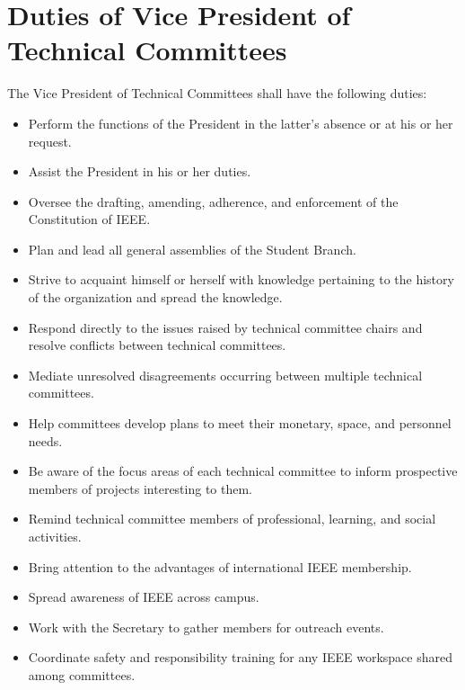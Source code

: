 \documentclass[12pt]{constitution}
\begin{document}
\section{Duties of Vice President of Technical Committees}
\label{sec:officer_vp_Tech}
The Vice President of Technical Committees shall have the following duties:
\begin{itemize}
    \item Perform the functions of the President in the latter's absence or at his or her request.
    \item Assist the President in his or her duties.
    \item Oversee the drafting, amending, adherence, and enforcement of the Constitution of IEEE.
    \item Plan and lead all general assemblies of the Student Branch.
    \item Strive to acquaint himself or herself with knowledge pertaining to the history of the organization and spread the knowledge.
    \item Respond directly to the issues raised by technical committee chairs and resolve conflicts between technical committees.
    \item Mediate unresolved disagreements occurring between multiple technical committees.
    \item Help committees develop plans to meet their monetary, space, and personnel needs.
    \item Be aware of the focus areas of each technical committee to inform prospective members of projects interesting to them.
    \item Remind technical committee members of professional, learning, and social activities.
    \item Bring attention to the advantages of international IEEE membership.
    \item Spread awareness of IEEE across campus.
    \item Work with the Secretary to gather members for outreach events.
    \item Coordinate safety and responsibility training for any IEEE workspace shared among committees.
\end{itemize}
\end{document}
